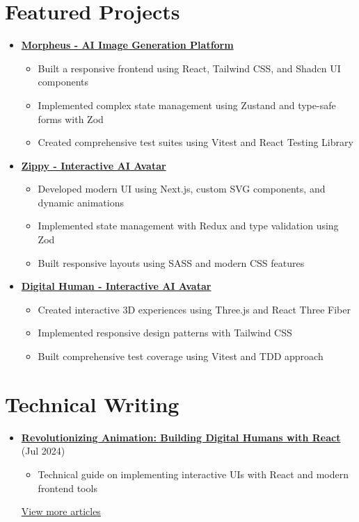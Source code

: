 \documentclass[letterpaper,11pt]{article}
\begin{document}
\section{Featured Projects}
\begin{itemize}[leftmargin=*]
    \item \textbf{\href{https://github.com/Monadical-SAS/Morpheus}{Morpheus - AI Image Generation Platform \faExternalLink}}
    \begin{itemize}
        \item Built a responsive frontend using React, Tailwind CSS, and Shadcn UI components
        \item Implemented complex state management using Zustand and type-safe forms with Zod
        \item Created comprehensive test suites using Vitest and React Testing Library
    \end{itemize}
    
    \item \textbf{\href{https://github.com/asanchezyali/ai-avatar}{Zippy - Interactive AI Avatar \faExternalLink}}
    \begin{itemize}
        \item Developed modern UI using Next.js, custom SVG components, and dynamic animations
        \item Implemented state management with Redux and type validation using Zod
        \item Built responsive layouts using SASS and modern CSS features
    \end{itemize}

    \item \textbf{\href{https://github.com/asanchezyali/talking-avatar-with-ai}{Digital Human - Interactive AI Avatar \faExternalLink}}
    \begin{itemize}
        \item Created interactive 3D experiences using Three.js and React Three Fiber
        \item Implemented responsive design patterns with Tailwind CSS
        \item Built comprehensive test coverage using Vitest and TDD approach
    \end{itemize}
\end{itemize}

\section{Technical Writing}
\begin{itemize}[leftmargin=*]    
    \item \textbf{\href{https://www.asanchezyali.com/blog/en/ai-avatars/20240703DigitalHuman}{Revolutionizing Animation: Building Digital Humans with React}} (Jul 2024)
    \begin{itemize}
        \item Technical guide on implementing interactive UIs with React and modern frontend tools
    \end{itemize}
    
    \href{https://www.asanchezyali.com/}{View more articles \faExternalLink}
\end{itemize}
\end{document}
